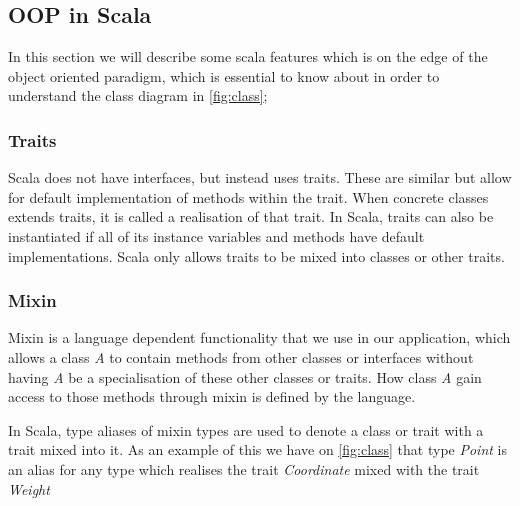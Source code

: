\subsection{OOP in Scala}
In this section we will describe some scala features which is on the edge of the object oriented paradigm, which is essential to know about in order to understand the class diagram in \cref{fig:class};

\subsubsection{Traits}
Scala does not have interfaces, but instead uses traits. These are similar but allow for default implementation of methods within the trait. When concrete classes extends traits, it is called a realisation of that trait. In Scala, traits can also be instantiated if all of its instance variables and methods have default implementations. Scala only allows traits to be mixed into classes or other traits.

\subsubsection{Mixin}
Mixin is a language dependent functionality that we use in our application, which allows a class \emph{A} to contain methods from other classes or interfaces without having \emph{A} be a specialisation of these other classes or traits. How class \emph{A} gain access to those methods through mixin is defined by the language. 

In Scala, type aliases of mixin types are used to denote a class or trait with a trait mixed into it. As an example of this we have on \cref{fig:class} that type \emph{Point} is an alias for any type which realises the trait \emph{Coordinate} mixed with the trait \emph{Weight}
